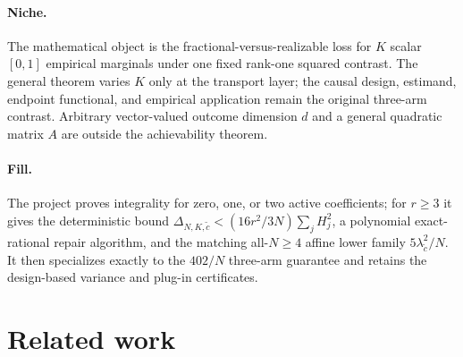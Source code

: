 \documentclass{article}
\begin{document}
\paragraph{Niche.} The mathematical object is the fractional-versus-realizable loss for \(K\) scalar \([0,1]\) empirical marginals under one fixed rank-one squared contrast.  The general theorem varies \(K\) only at the transport layer; the causal design, estimand, endpoint functional, and empirical application remain the original three-arm contrast.  Arbitrary vector-valued outcome dimension \(d\) and a general quadratic matrix \(A\) are outside the achievability theorem.

\paragraph{Fill.} The project proves integrality for zero, one, or two active coefficients; for \(r\ge3\) it gives the deterministic bound \(\Delta_{N,K,\widetilde c}<(16r^2/3N)\sum_jH_j^2\), a polynomial exact-rational repair algorithm, and the matching all-\(N\ge4\) affine lower family \(5\lambda_{\widetilde c}^2/N\).  It then specializes exactly to the \(402/N\) three-arm guarantee and retains the design-based variance and plug-in certificates.

\section{Related work}
\end{document}
